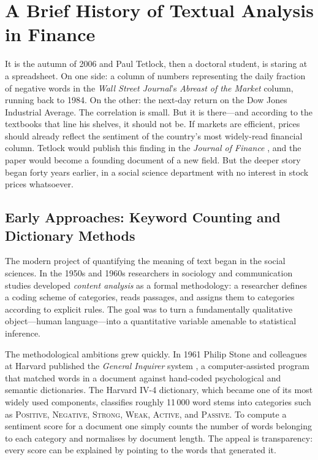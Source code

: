 \section{A Brief History of Textual Analysis in Finance}
\label{sec:history}

\begin{context}
It is the autumn of 2006 and Paul Tetlock, then a doctoral student, is staring
at a spreadsheet.  On one side: a column of numbers representing the daily
fraction of negative words in the \emph{Wall Street Journal}'s \emph{Abreast of
the Market} column, running back to 1984.  On the other: the next-day return on
the Dow Jones Industrial Average.  The correlation is small.  But it is
there---and according to the textbooks that line his shelves, it should not be.
If markets are efficient, prices should already reflect the sentiment of the
country's most widely-read financial column.  Tetlock would publish this finding
in the \emph{Journal of Finance} \cite{tetlock2007giving}, and the paper would
become a founding document of a new field.  But the deeper story began forty
years earlier, in a social science department with no interest in stock prices
whatsoever.

\subsection{Early Approaches: Keyword Counting and Dictionary Methods}
\label{sec:history-early}

The modern project of quantifying the meaning of text began in the social sciences.
In the 1950s and 1960s researchers in sociology and communication studies developed
\emph{content analysis} as a formal methodology: a researcher defines a coding scheme
of categories, reads passages, and assigns them to categories according to explicit
rules.  The goal was to turn a fundamentally qualitative object---human language---into
a quantitative variable amenable to statistical inference.

The methodological ambitions grew quickly.  In 1961 Philip Stone and colleagues at
Harvard published the \emph{General Inquirer} system
\cite{stone1966general}, %
a computer-assisted program that matched words in a document against hand-coded
psychological and semantic dictionaries.  The Harvard IV-4 dictionary, which became one
of its most widely used components, classifies roughly 11\,000 word stems into
categories such as \textsc{Positive}, \textsc{Negative}, \textsc{Strong},
\textsc{Weak}, \textsc{Active}, and \textsc{Passive}.  To compute a sentiment score for
a document one simply counts the number of words belonging to each category and
normalises by document length.  The appeal is transparency: every score can be
explained by pointing to the words that generated it.


\end{context}
